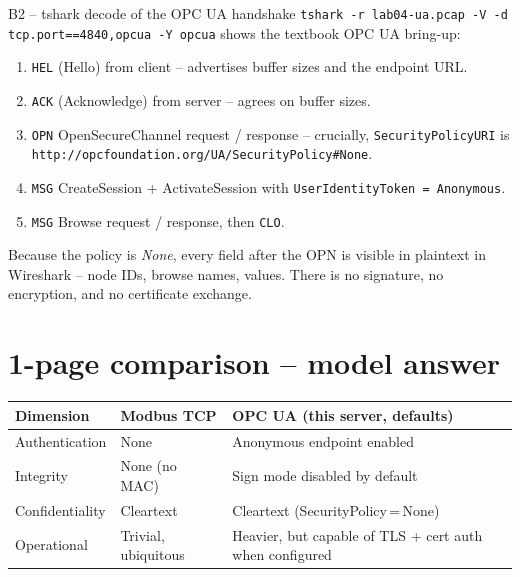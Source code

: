 \documentclass[11pt,a4paper]{article}
\begin{document}
\begin{solutionbox}{B2 -- tshark decode of the OPC UA handshake}
\texttt{tshark -r lab04-ua.pcap -V -d tcp.port==4840,opcua -Y opcua}
shows the textbook OPC UA bring-up:
\begin{enumerate}[leftmargin=*, nosep]
  \item \texttt{HEL} (Hello) from client -- advertises buffer sizes and
        the endpoint URL.
  \item \texttt{ACK} (Acknowledge) from server -- agrees on buffer sizes.
  \item \texttt{OPN} OpenSecureChannel request / response -- crucially,
        \texttt{SecurityPolicyURI} is\\
        \texttt{http://opcfoundation.org/UA/SecurityPolicy\#None}.
  \item \texttt{MSG} CreateSession + ActivateSession with
        \texttt{UserIdentityToken = Anonymous}.
  \item \texttt{MSG} Browse request / response, then \texttt{CLO}.
\end{enumerate}
Because the policy is \emph{None}, every field after the OPN is visible
in plaintext in Wireshark -- node IDs, browse names, values. There is
no signature, no encryption, and no certificate exchange.
\end{solutionbox}

\section*{1-page comparison -- model answer}

\renewcommand{\arraystretch}{1.25}
\begin{center}
\small
\begin{tabular}{@{}p{2.6cm}p{4.4cm}p{7.2cm}@{}}
\toprule
\textbf{Dimension} & \textbf{Modbus TCP} & \textbf{OPC UA (this server, defaults)} \\
\midrule
Authentication   & None                              & Anonymous endpoint enabled \\
Integrity        & None (no MAC)                     & Sign mode disabled by default \\
Confidentiality  & Cleartext                         & Cleartext (SecurityPolicy\,=\,None) \\
Operational      & Trivial, ubiquitous               & Heavier, but capable of TLS + cert auth when configured \\
\bottomrule
\end{tabular}
\end{center}
\end{document}

